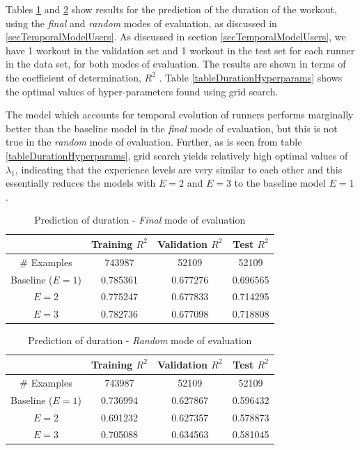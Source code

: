 \documentclass{acm_proc_article-sp}
\begin{document}
Tables \ref{tableDurationFinal} and \ref{tableDurationRandom} show results for the prediction of the duration of the workout, using the  \emph{final} and \emph{random} modes of evaluation, as discussed in \ref{secTemporalModelUsers}. As discussed in section \ref{secTemporalModelUsers}, we have 1 workout in the validation set and 1 workout in the test set for each runner in the data set, for both modes of evaluation. The results are shown in terms of the coefficient of determination, $R^2$ \cite{r2Wiki}. Table \ref{tableDurationHyperparams} shows the optimal values of hyper-parameters found using grid search.

The model which accounts for temporal evolution of runners performs marginally better than the baseline model in the \emph{final} mode of evaluation, but this is not true in the \emph{random} mode of evaluation. Further, as is seen from table \ref{tableDurationHyperparams}, grid search yields relatively high optimal values of $\lambda_1$, indicating that the experience levels are very similar to each other and this essentially reduces the models with $E = 2$ and $E = 3$ to the baseline model $E = 1$.

\begin{table}[H]
\centering
\begin{tabular}{|c|c|c|c|} \hline
& Training $R^2$ & Validation $R^2$ & Test $R^2$ \\ \hline
\# Examples & 743987 & 52109 & 52109 \\ \hline
Baseline ($E = 1$) & 0.785361 & 0.677276 & 0.696565 \\ \hline
$E = 2$ & 0.775247 & 0.677833 & 0.714295 \\ \hline
$E = 3$ & 0.782736 & 0.677098 & 0.718808 \\ \hline
\end{tabular}
\caption{Prediction of duration - \emph{Final} mode of evaluation }
\label{tableDurationFinal}
\end{table}

\begin{table}[H]
\centering
\begin{tabular}{|c|c|c|c|} \hline
& Training $R^2$ & Validation $R^2$ & Test $R^2$ \\ \hline
\# Examples & 743987 & 52109 & 52109  \\ \hline
Baseline ($E = 1$) & 0.736994 & 0.627867 & 0.596432 \\ \hline
$E = 2$ & 0.691232 & 0.627357 & 0.578873 \\ \hline
$E = 3$ & 0.705088 & 0.634563 & 0.581045 \\ \hline
\end{tabular}
\caption{Prediction of duration - \emph{Random} mode of evaluation }
\label{tableDurationRandom}
\end{table}
\end{document}
